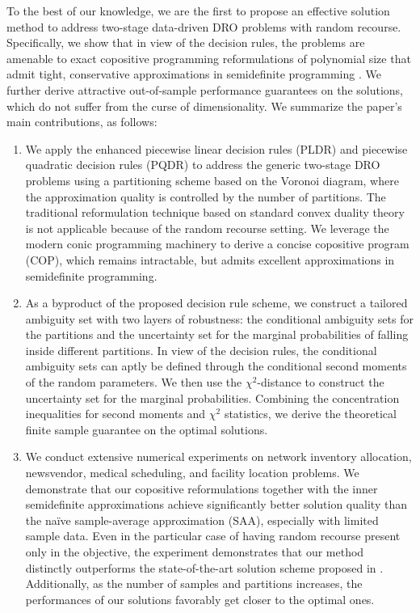 \documentclass{article}
\begin{document}
To  the best of our knowledge, we are the first to propose an effective solution method to address two-stage data-driven DRO problems with random recourse. Specifically, we show that in view of the decision rules, the problems are amenable to exact copositive programming reformulations of polynomial size that admit tight, conservative approximations in semidefinite programming \cite{MSRO-decision-rules}. We further derive attractive out-of-sample performance guarantees on the solutions, which do not suffer from the curse of dimensionality. We summarize the paper’s main contributions, as follows:
\begin{enumerate}
    \item 	We apply the enhanced piecewise linear decision rules (PLDR) and piecewise quadratic decision rules (PQDR) to address the generic two-stage DRO problems using a partitioning scheme based on the Voronoi diagram, where the approximation quality is controlled by the number of partitions.  The traditional reformulation technique based on standard convex duality theory is not applicable because of the random recourse setting. We leverage the modern conic programming machinery to derive a concise copositive program (COP), which remains intractable, but admits excellent approximations in semidefinite programming.  
    \item As a byproduct of the proposed decision rule scheme, we construct a tailored ambiguity set with two layers of robustness: the conditional ambiguity sets for the partitions and the uncertainty set for  the marginal probabilities of falling inside different partitions. In view of the decision rules, the conditional ambiguity sets can aptly be defined through the conditional second moments of the random parameters. We then use the $\chi^2$-distance to construct the uncertainty set for the marginal probabilities. Combining the concentration inequalities for second moments and $\chi^2$ statistics, we derive the theoretical finite sample guarantee on the optimal solutions. 
    \item %
    We conduct extensive numerical experiments on network inventory allocation, newsvendor,  medical scheduling, and facility location problems.  We demonstrate that our copositive reformulations together with the inner semidefinite approximations achieve significantly better solution quality than the na\"ive sample-average approximation (SAA), especially with limited sample data. Even in the particular case of having random recourse present only in the objective, the experiment demonstrates that our method distinctly outperforms the state-of-the-art solution scheme proposed in \cite{Wass-SDP}. Additionally, as the number of samples and partitions increases, the performances of our solutions favorably get closer to the optimal ones.  

\end{enumerate}
\end{document}

